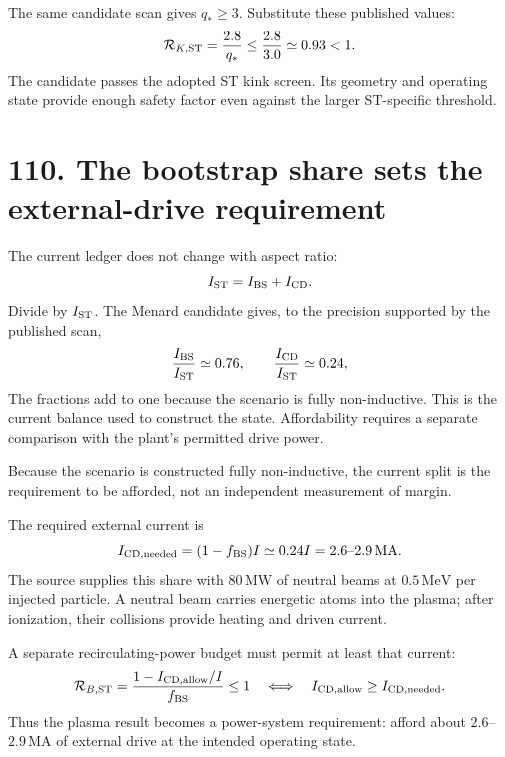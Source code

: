 \documentclass[11pt]{article}
\begin{document}
The same candidate scan gives $q_*\ge3$. Substitute these published values:
\begin{equation}
 {\cal R}_{K,\rm ST}=\frac{2.8}{q_*}
\le\frac{2.8}{3.0}\simeq0.93<1.
 \label{eq:st-kink-closure}
\end{equation}
The candidate passes the adopted ST kink screen. Its geometry and operating state
provide enough safety factor even against the larger ST-specific threshold.


\section*{110. The bootstrap share sets the external-drive requirement}
The current ledger does not change with aspect ratio:
\[
 I_{\rm ST}=I_{\rm BS}+I_{\rm CD}.
\]
Divide by $I_{\rm ST}$. The Menard candidate gives, to the precision supported by the
published scan,
\[
 \frac{I_{\rm BS}}{I_{\rm ST}}\simeq0.76,\qquad
 \frac{I_{\rm CD}}{I_{\rm ST}}\simeq0.24,
\]
The fractions add to one because the scenario is fully non-inductive. This is the
current balance used to construct the state. Affordability requires a separate
comparison with the plant's permitted drive power.

Because the scenario is constructed fully non-inductive, the current split is the requirement to be afforded, not an independent measurement of margin.

The required external current is
\begin{equation}
 I_{\rm CD,needed}=(1-f_{\rm BS})I\simeq0.24I
 =2.6\text{--}2.9\,\mathrm{MA}.
 \label{eq:st-current-drive-needed}
\end{equation}
The source supplies this share with $80\,\mathrm{MW}$ of neutral beams at
$0.5\,\mathrm{MeV}$ per injected particle. A neutral beam carries energetic atoms
into the plasma; after ionization, their collisions provide heating and driven current.

A separate recirculating-power budget must permit at least that current:
\begin{equation}
 {\cal R}_{B,\rm ST}=
\frac{1-I_{\rm CD,allow}/I}{f_{\rm BS}}\le1
\quad\Longleftrightarrow\quad
 I_{\rm CD,allow}\ge I_{\rm CD,needed}.
 \label{eq:st-bootstrap-conditional-closure}
\end{equation}
Thus the plasma result becomes a power-system requirement: afford about
$2.6$--$2.9\,\mathrm{MA}$ of external drive at the intended operating state.
\end{document}
